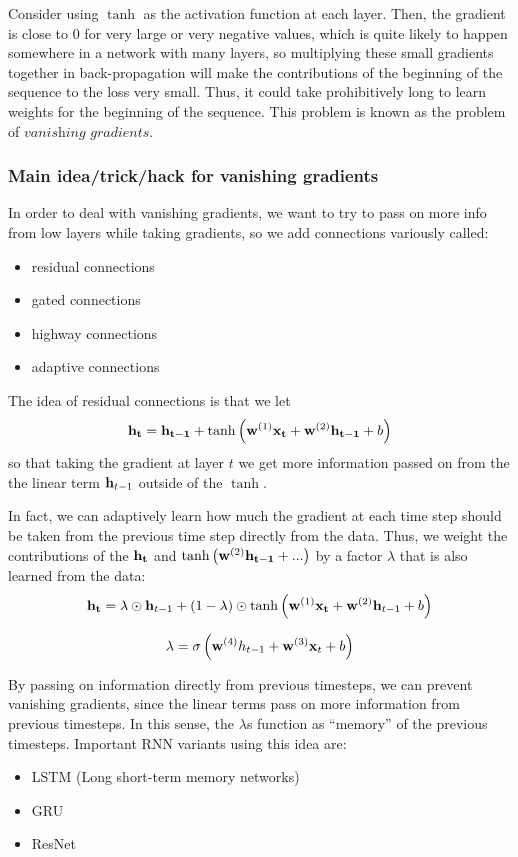 \documentclass{article}
\begin{document}
\vspace{0.1in}

Consider using $\tanh$ as the activation function at each layer. Then, the gradient is close to $0$ for very large or very negative values, which is quite likely to happen somewhere in a network with many layers, so multiplying these small gradients together in back-propagation will make the contributions of the beginning of the sequence to the loss very small. Thus, it could take prohibitively long to learn weights for the beginning of the sequence. This problem is known as the problem of $\textit{vanishing gradients}$.

\subsubsection{Main idea/trick/hack for vanishing gradients}

In order to deal with vanishing gradients, we want to try to pass on more info from low layers while taking gradients, so we add connections variously called:
\begin{itemize}
    \item residual connections
    \item gated connections
    \item highway connections
    \item adaptive connections
\end{itemize}

The idea of residual connections is that we let $$\bold{h_t} = \bold{h_{t-1}} + \tanh\left(\bold{w}^{(1)} \bold{x_t} + \bold{w}^{(2)} \bold{h_{t-1}} + b\right) $$ so that taking the gradient at layer $t$ we get more information passed on from the the linear term $\bold{h}_{t-1}$ outside of the $\tanh$.

In fact, we can adaptively learn how much the gradient at each time step should be taken from the previous time step directly from the data. Thus, we weight the contributions of the $\bold{h_t}$ and $\tanh\left(\bold{w}^{(2)} \bold{h_{t-1}} +...\right)$ by a factor $\lambda$ that is also learned from the data:
$$\bold{h_t} = \lambda \odot \bold{h}_{t-1} + (1-\lambda) \odot \tanh\left(\bold{w}^{(1)} \bold{x_t} + \bold{w}^{(2)}  \bold{h}_{t-1} + b\right)$$ 

$$\lambda = \sigma\left(\bold{w}^{(4)}h_{t-1} + \bold{w}^{(3)} \bold{x}_t + b \right)$$

By passing on information directly from previous timesteps, we can prevent vanishing gradients, since the linear terms pass on more information from previous timesteps. In this sense, the $\lambda$s function as ``memory'' of the previous timesteps. Important RNN variants using this idea are:
\begin{itemize}
    \item LSTM (Long short-term memory networks)
    \item GRU
    \item ResNet
\end{itemize}
\end{document}

